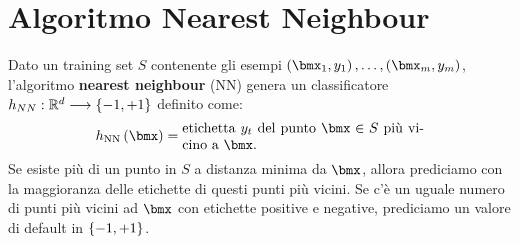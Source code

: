 \documentclass[\main/main.tex]{subfiles}
\begin{document}
\chapter{Algoritmo Nearest Neighbour}
\begin{multicols}{2}
    \begin{definition}
        Dato un training set \(S\) contenente gli esempi \(\examples{m}\), l'algoritmo \textbf{nearest neighbour} (NN) genera un classificatore \(h_{NN}:\mathbb{R}^d\longrightarrow \left\{-1, +1\right\}\) definito come:
        \[
            \hNN{\bmx} = \parbox{0.5\textwidth}{etichetta \(y_t\) del punto \(\bmx \in S\) più vicino a \(\bmx\).}
        \]
        Se esiste più di un punto in \(S\) a distanza minima da \(\bmx\), allora prediciamo con la maggioranza delle etichette di questi punti più vicini. Se c'è un uguale numero di punti più vicini ad \(\bmx\) con etichette positive e negative, prediciamo un valore di default in \(\left\{-1, +1\right\}\).


\end{definition}
\end{multicols}
\end{document}
